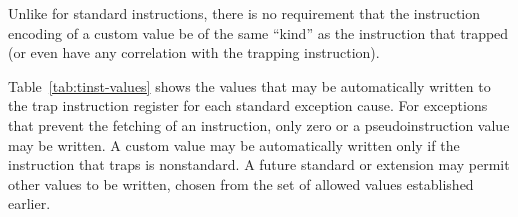 \begin{commentary}
Unlike for standard instructions, there is no requirement that the
instruction encoding of a custom value be of the same ``kind'' as the
instruction that trapped (or even have any correlation with the trapping
instruction).
\end{commentary}

Table~\ref{tab:tinst-values} shows the values that may be automatically
written to the trap instruction register for each standard exception
cause.
For exceptions that prevent the fetching of an instruction, only zero or
a pseudoinstruction value may be written.
A custom value may be automatically written only if the instruction that
traps is nonstandard.
A future standard or extension may permit other values to be written,
chosen from the set of allowed values established earlier.

